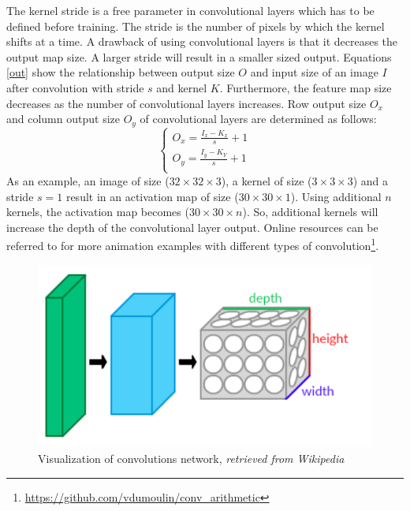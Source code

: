     The kernel stride is a free parameter in convolutional layers which has to be defined before training. The stride is the number of pixels by which the kernel shifts at a time. A drawback of using convolutional layers is that it decreases the output map size. A larger stride will result in a smaller sized output. Equations \ref{out} show the relationship between output size $O$ and input size of an image $I$ after convolution with stride $s$ and kernel $K$. Furthermore, the feature map size decreases as the number of convolutional layers increases. Row output size $O_x$ and column output size $O_y$ of convolutional layers are determined as follows:
    \begin{equation}
        \begin{cases}
            O_x = \frac{I_x-K_x}{s} + 1 \\
            O_y = \frac{I_y - K_Y}{s} + 1 \\
        \end{cases}
        \label{out}
    \end{equation}
    As an example, an image of size ($32\times 32 \times 3$), a kernel of size ($3\times 3\times 3$) and a stride $s=1$ result in an activation map of size ($30 \times 30 \times 1$). Using additional $n$ kernels, the activation map becomes ($30\times30\times n$). So, additional kernels will increase the depth of the convolutional layer output. Online resources can be referred to for more animation examples with different types of convolution\footnote{\url{https://github.com/vdumoulin/conv_arithmetic}}.

    \begin{figure}[!h]
        \centering
        \includegraphics[scale = 0.3]{Figures/Conv_layers.png}
        \caption{Visualization of convolutions network, \textit{retrieved from Wikipedia}}
    \end{figure}

